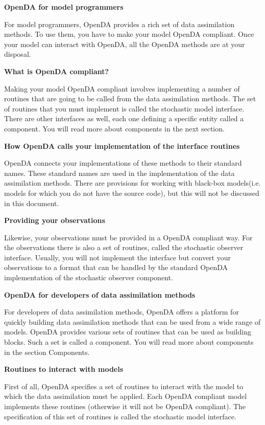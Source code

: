 \textbf{OpenDA for model programmers}

For model programmers, OpenDA provides a rich set of data assimilation methods. To use them, you have to make your model OpenDA compliant. Once your model can interact with OpenDA, all the OpenDA methods are at your disposal.

\textbf{What is OpenDA compliant?}

Making your model OpenDA compliant involves implementing a number of routines that are going to be called from the data assimilation methods. The set of routines that you must implement is called the stochastic model interface. There are other interfaces as well, each one defining a specific entity called a component. You will read more about components in the next section.

\textbf{How OpenDA calls your implementation of the interface routines}

OpenDA connects your implementations of these methods to their standard names. These standard names are used in the implementation of the data assimilation methods. There are provisions for working with black-box models(i.e. models for which you do not have the source code), but this will not be discussed in this document.

\textbf{Providing your observations}

Likewise, your observations must be provided in a OpenDA compliant way. For the observations there is also a set of routines, called the stochastic observer interface. Usually, you will not implement the interface but convert your observations to a format that can be handled by the standard OpenDA implementation of the stochastic observer component.

\textbf{OpenDA for developers of data assimilation methods}

For developers of data assimilation methods, OpenDA offers a platform for quickly building data assimilation methods that can be used from a wide range of models. OpenDA provides various sets of routines that can be used as building blocks. Such a set is called a component. You will read more about components in the section Components.

\textbf{Routines to interact with models}

First of all, OpenDA specifies a set of routines to interact with the model to which the data assimilation must be applied. Each OpenDA compliant model implements these routines (otherwise it will not be OpenDA compliant). The specification of this set of routines is called the stochastic model interface.

